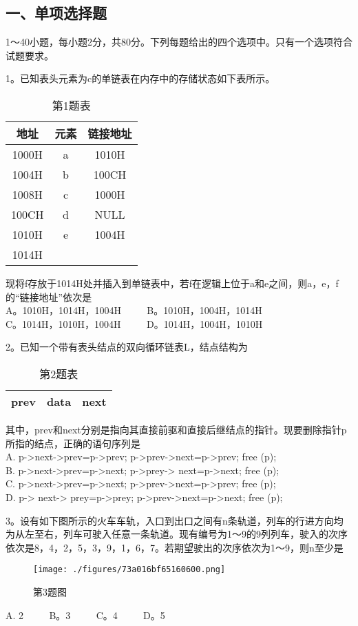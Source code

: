 
\subsection{一、单项选择题}
1～40小题，每小题2分，共80分。下列每题给出的四个选项中。只有一个选项符合试题要求。

1。已知表头元素为c的单链表在内存中的存储状态如下表所示。
\begin{table}[ht]
\centering
\caption{第1题表}\label{tab_CSN16_1}
\begin{tabular}{|c|c|c|}
\hline
地址 & 元素 & 链接地址 \\
\hline
1000H & a & 1010H \\
\hline
1004H & b & 100CH \\
\hline
1008H & c & 1000H \\
\hline
100CH & d & NULL \\
\hline
1010H & e & 1004H \\
\hline
1014H &   &  \\
\hline
\end{tabular}
\end{table}
现将f存放于1014H处并插入到单链表中，若f在逻辑上位于a和e之间，则a，e，f的“链接地址”依次是 \\
A。1010H，1014H，1004H $\qquad$ B。1010H，1004H，1014H \\
C。1014H，1010H，1004H $\qquad$ D。1014H，1004H，1010H

2。已知一个带有表头结点的双向循环链表L，结点结构为 \\
\begin{table}[ht]
\centering
\caption{第2题表}\label{tab_CSN16_2}
\begin{tabular}{|c|c|c|}
\hline
prev & data & next \\
\hline
\end{tabular}
\end{table}
其中，prev和next分别是指向其直接前驱和直接后继结点的指针。现要删除指针p所指的结点，正确的语句序列是 \\
A. p->next->prev=p->prev; p->prev->next=p->prev; free (p); \\
B. p->next->prev=p->next; p->prey-> next=p->next; free (p); \\
C. p->next->prev=p->next; p->prev->next=p->prev; free (p); \\
D. p-> next-> prey=p->prey; p->prev->next=p->next; free (p);

3。设有如下图所示的火车车轨，入口到出口之间有n条轨道，列车的行进方向均为从左至右，列车可驶入任意一条轨道。现有编号为1～9的9列列车，驶入的次序依次是8，4，2，5，3，9，1，6，7。若期望驶出的次序依次为1～9，则n至少是 \\
\begin{figure}[ht]
\centering
\texttt{[image: ./figures/73a016bf65160600.png]}
\caption{第3题图} \label{fig_CSN16_1}
\end{figure}
A. 2 $\qquad$ B。3 $\qquad$ C。4 $\qquad$ D。5

